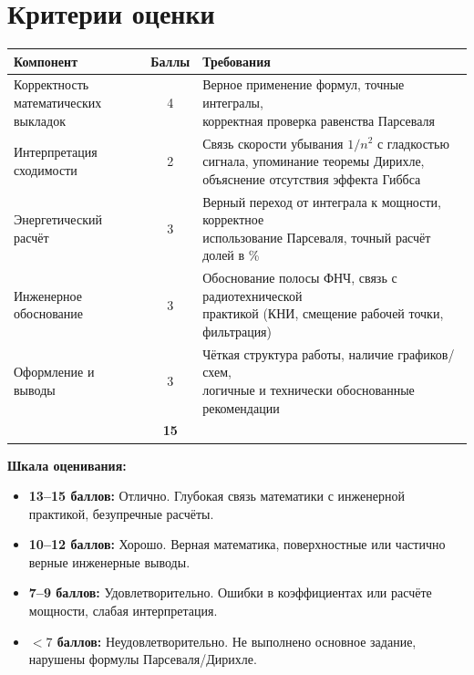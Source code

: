 \documentclass[a4paper,12pt]{article}
\begin{document}
\section{Критерии оценки}
\renewcommand{\arraystretch}{1.25}
\footnotesize
\begin{tabularx}{\textwidth}{@{}>{\raggedright\arraybackslash}p{}c>{\raggedright\arraybackslash}X@{}}
\toprule
\textbf{Компонент} & \textbf{Баллы} & \textbf{Требования} \\
\midrule
Корректность математических выкладок & 4 & \makecell[l]{Верное применение формул, точные интегралы, \\ корректная проверка равенства Парсеваля} \\
Интерпретация сходимости & 2 & \makecell[l]{Связь скорости убывания $1/n^2$ с гладкостью сигнала, \\ упоминание теоремы Дирихле, объяснение отсутствия \\ эффекта Гиббса} \\
Энергетический расчёт & 3 & \makecell[l]{Верный переход от интеграла к мощности, корректное \\ использование Парсеваля, точный расчёт долей в \%} \\
Инженерное обоснование & 3 & \makecell[l]{Обоснование полосы ФНЧ, связь с радиотехнической \\ практикой (КНИ, смещение рабочей точки, фильтрация)} \\
Оформление и выводы & 3 & \makecell[l]{Чёткая структура работы, наличие графиков/схем, \\ логичные и технически обоснованные рекомендации} \\
\midrule
\multicolumn{2}{@{}l}{\textbf{Итого}} & \textbf{15} \\
\bottomrule
\end{tabularx}

\medskip
\noindent\textbf{Шкала оценивания:}
\begin{itemize}[label=$\circ$, leftmargin=*]
    \item \textbf{13--15 баллов:} Отлично. Глубокая связь математики с инженерной практикой, безупречные расчёты.
    \item \textbf{10--12 баллов:} Хорошо. Верная математика, поверхностные или частично верные инженерные выводы.
    \item \textbf{7--9 баллов:} Удовлетворительно. Ошибки в коэффициентах или расчёте мощности, слабая интерпретация.
    \item \textbf{$<7$ баллов:} Неудовлетворительно. Не выполнено основное задание, нарушены формулы Парсеваля/Дирихле.
\end{itemize}
\end{document}
